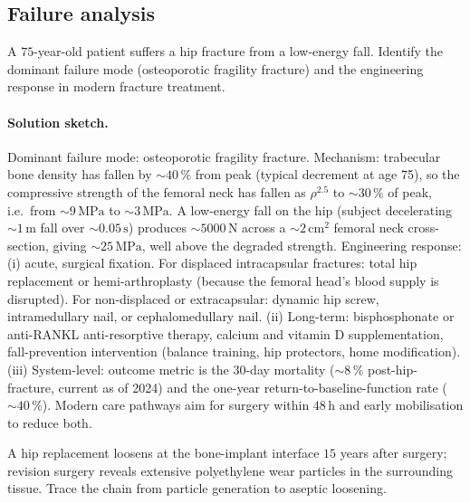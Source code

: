 \subsection*{Failure analysis}

\begin{exercise}
A $75$-year-old patient suffers a hip fracture from a low-energy
fall. Identify the dominant failure mode (osteoporotic fragility
fracture) and the engineering response in modern fracture
treatment.
\end{exercise}

\paragraph{Solution sketch.}
Dominant failure mode: osteoporotic fragility fracture. Mechanism:
trabecular bone density has fallen by $\sim 40\,\%$ from peak
(typical decrement at age 75), so the compressive strength of the
femoral neck has fallen as $\rho^{2.5}$ to $\sim 30\,\%$ of peak,
i.e.\ from $\sim 9\,\text{MPa}$ to $\sim 3\,\text{MPa}$. A low-energy
fall on the hip (subject decelerating $\sim 1\,\text{m}$ fall over
$\sim 0.05\,\text{s}$) produces $\sim 5000\,\text{N}$ across a
$\sim 2\,\text{cm}^2$ femoral neck cross-section, giving
$\sim 25\,\text{MPa}$, well above the degraded strength. Engineering
response: (i) acute, surgical fixation. For displaced intracapsular
fractures: total hip replacement or hemi-arthroplasty (because the
femoral head's blood supply is disrupted). For non-displaced or
extracapsular: dynamic hip screw, intramedullary nail, or
cephalomedullary nail.
(ii) Long-term: bisphosphonate or anti-RANKL anti-resorptive
therapy, calcium and vitamin D supplementation, fall-prevention
intervention (balance training, hip protectors, home modification).
(iii) System-level: outcome metric is the $30$-day mortality
($\sim 8\,\%$ post-hip-fracture, current as of 2024) and the
one-year return-to-baseline-function rate ($\sim 40\,\%$). Modern
care pathways aim for surgery within $48\,\text{h}$ and early
mobilisation to reduce both.

\begin{exercise}
A hip replacement loosens at the bone-implant interface $15$ years
after surgery; revision surgery reveals extensive polyethylene wear
particles in the surrounding tissue. Trace the chain from particle
generation to aseptic loosening.
\end{exercise}

